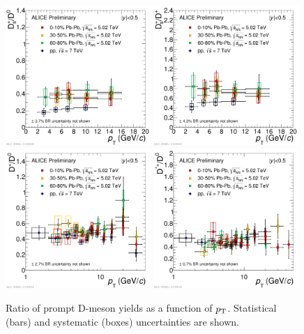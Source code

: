 \begin{figure}[!t]
 \begin{center}
\includegraphics[width=0.49\textwidth]{FigCap5/RatioDsD0-PbPb-010-3050-6080-502-pp-7.pdf}
\includegraphics[width=0.49\textwidth]{FigCap5/RatioDsDplus-PbPb-010-3050-6080-502-pp-7.pdf}
\includegraphics[width=0.49\textwidth]{FigCap5/RatioDplusDzero-PbPb-010-3050-6080-502-pp-7.pdf}
\includegraphics[width=0.49\textwidth]{FigCap5/RatioDstarDzero-PbPb-010-3050-6080-502-pp-7.pdf}
 \end{center}
 \caption{Ratio of prompt D-meson yields as a function of $p_{\rm T}$.
Statistical (bars) and systematic (boxes) uncertainties are shown.}
 \label{fig:DmesRatio} 
\end{figure} 

